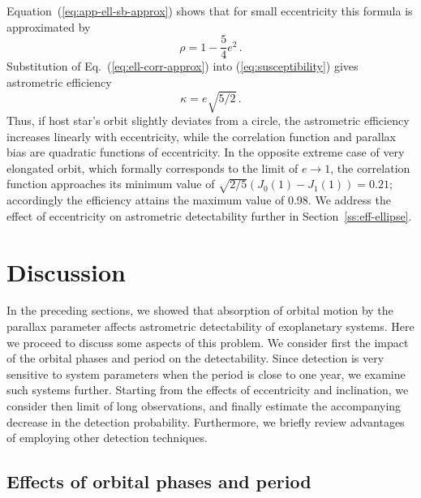 \documentclass[fleqn,usenatbib,useAMS,usedcolumn]{mnras}
\begin{document}
Equation~(\ref{eq:app-ell-sb-approx}) shows that for small eccentricity this formula is approximated by
\begin{equation}\label{eq:ell-corr-approx}
  \rho=1-\frac{5}{4}e^2\,.
\end{equation}
Substitution of Eq.~(\ref{eq:ell-corr-approx}) into (\ref{eq:susceptibility}) gives astrometric efficiency
\begin{equation}
  \kappa=e\sqrt{5/2}\,.
\end{equation}
Thus, if host star's orbit slightly deviates from a circle, the astrometric efficiency increases linearly with eccentricity, while the correlation function and parallax bias are quadratic functions of eccentricity. In the opposite extreme case of very elongated orbit, which formally corresponds to the limit of $e\to 1$, the correlation function approaches its minimum value of $\sqrt{2/5}\left(J_0\left(1\right)-J_1\left(1\right)\right)=0.21$; accordingly the efficiency attains the maximum value of 0.98. We address the effect of eccentricity on astrometric detectability further in Section~\ref{ss:eff-ellipse}.

\section{Discussion}\label{s:discussion}

In the preceding sections, we showed that absorption of orbital motion by the parallax parameter affects astrometric detectability of exoplanetary systems. Here we proceed to discuss some aspects of this problem. We consider first the impact of the orbital phases and period on the detectability. Since detection is very sensitive to system parameters when the period is close to one year, we examine such systems further.
Starting from the effects of eccentricity and inclination, we consider then limit of long observations, and finally estimate the accompanying decrease in the detection probability. Furthermore, we briefly review advantages of employing other detection techniques.

\subsection{Effects of orbital phases and period}
\label{ss:phase}
\end{document}
